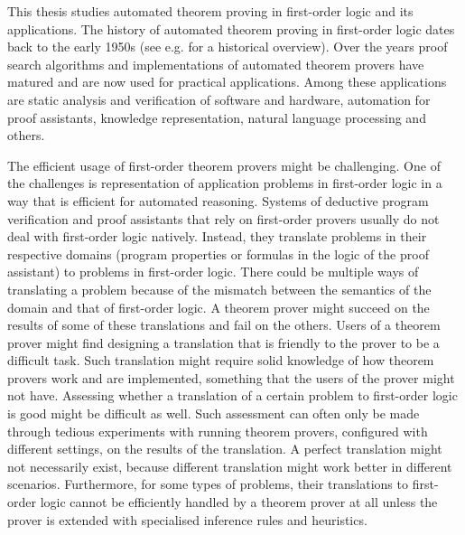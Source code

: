 
This thesis studies automated theorem proving in first-order logic and its applications. The history of automated theorem proving in first-order logic dates back to the early 1950s (see e.g. \cite{bundy1999survey,davis2001early,harrison2007short} for a historical overview). Over the years proof search algorithms and implementations of automated theorem provers have matured and are now used for practical applications. Among these applications are static analysis and verification of software and hardware, automation for proof assistants, knowledge representation, natural language processing and others.

The efficient usage of first-order theorem provers might be challenging. One of the challenges is representation of application problems in first-order logic in a way that is efficient for automated reasoning. Systems of deductive program verification and proof assistants that rely on first-order provers usually do not deal with first-order logic natively. Instead, they translate problems in their respective domains (program properties or formulas in the logic of the proof assistant) to problems in first-order logic. There could be multiple ways of translating a problem because of the mismatch between the semantics of the domain and that of first-order logic. A theorem prover might succeed on the results of some of these translations and fail on the others. Users of a theorem prover might find designing a translation that is friendly to the prover to be a difficult task. Such translation might require solid knowledge of how theorem provers work and are implemented, something that the users of the prover might not have. Assessing whether a translation of a certain problem to first-order logic is good might be difficult as well. Such assessment can often only be made through tedious experiments with running theorem provers, configured with different settings, on the results of the translation. A perfect translation might not necessarily exist, because different translation might work better in different scenarios. Furthermore, for some types of problems, their translations to first-order logic cannot be efficiently handled by a theorem prover at all unless the prover is extended with specialised inference rules and heuristics.


